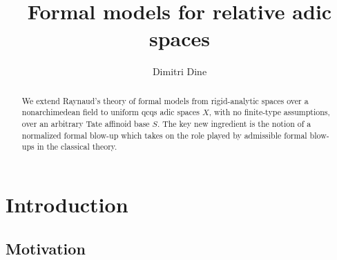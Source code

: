 \documentclass[12pt,twoside,a4paper]{article}
\theoremstyle{definition}
\theoremstyle{remark}
\begin{document}
 
\title{Formal models for relative adic spaces}
\author{Dimitri Dine}
\date{}
\maketitle

\begin{abstract}We extend Raynaud's theory of formal models from rigid-analytic spaces over a nonarchimedean field to uniform qcqs adic spaces $X$, with no finite-type assumptions, over an arbitrary Tate affinoid base $S$. The key new ingredient is the notion of a normalized formal blow-up which takes on the role played by admissible formal blow-ups in the classical theory. \end{abstract}

\tableofcontents

\section{Introduction}

\subsection{Motivation}
\end{document}
